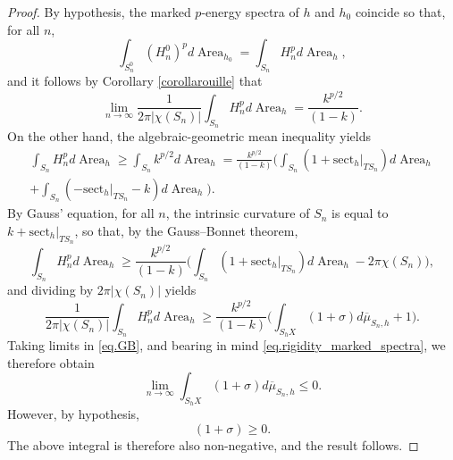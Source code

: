 \documentclass[11pt]{article}
\theoremstyle{plain}
\theoremstyle{definition}
\newcommand{\sect}{\mathrm{sect}}
\DeclareMathOperator{\Area}{Area}
\begin{document}
\begin{proof}
By hypothesis, the marked $p$-energy spectra of $h$ and $h_0$ coincide so that, for all $n$,\vspace*{-3pt}
\begin{equation*}
\int_{S^0_n}(H_n^0)^p d\Area_{h_0}=\int_{S_n} H_n^p d\Area_{h},
\end{equation*}
and it follows by Corollary \ref{corollarouille} that\vspace*{-3pt}
\begin{equation}\label{eq.rigidity_marked_spectra}
\lim_{n\to\infty}\frac{1}{2\pi|\chi(S_n)|}\int_{S_n} H_n^p d\Area_{h}=\frac{k^{p/2}}{(1-k)}.
\end{equation}
On the other hand, the algebraic-geometric mean inequality yields\vspace*{-3pt}
\begin{multline*}
\int_{S_n} H_n^p d\Area_{h}\geq\int_{S_n} k^{p/2}d\Area_{h}=\frac{k^{p/2}}{(1-k)}\biggl(\int_{S_n}(1+\sect_h|_{TS_n})d\Area_{h}\\[-3pt]
+ \int_{S_n} (-\sect_h|_{TS_n} - k)d\Area_{h}\biggr).
\end{multline*}
By Gauss' equation, for all $n$, the intrinsic curvature of $S_n$ is equal to $k+\sect_h|_{TS_n}$, so that, by the Gauss--Bonnet theorem,\vspace*{-3pt}
\begin{equation*}
\int_{S_n} H_n^p d\Area_{h} \geq \frac{k^{p/2}}{(1-k)}\biggl(\int_{S_n}(1+\sect_h|_{TS_n})d\Area_{h} - 2\pi\chi(S_n)\biggr),
\end{equation*}
and dividing by $2\pi\left|\chi(S_n)\right|$ yields\vspace*{-3pt}
\begin{equation}\label{eq.GB}
\frac{1}{2\pi|\chi(S_n)|}\int_{S_n} H_n^p d\Area_{h}\geq \frac{k^{p/2}}{(1-k)}\biggl(\int_{S_hX}(1+\sigma)d\overline\mu_{S_n,h}+1\biggr).
\end{equation}
Taking limits in \eqref{eq.GB}, and bearing in mind \eqref{eq.rigidity_marked_spectra}, we therefore obtain\vspace*{-3pt}
\begin{equation*}
\lim_{n\to\infty}\int_{S_hX}(1+\sigma)d\overline\mu_{S_n,h}\leq 0.
\end{equation*}
However, by hypothesis,
\begin{equation*}
(1+\sigma)\geq 0.
\end{equation*}
The above integral is therefore also non-negative, and the result follows.
\end{proof}
\end{document}
